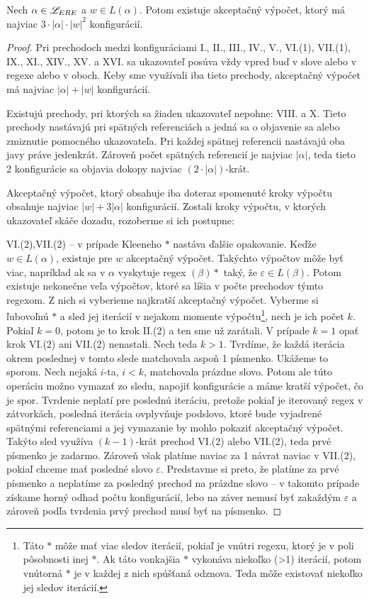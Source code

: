 \begin{lema}\label{dlzka_vypoctu_rw}
Nech $\alpha \in \mathscr{L}_{ERE}$ a $w \in L(\alpha)$. Potom existuje akceptačný výpočet, ktorý má najviac $3\cdot|\alpha|\cdot|w|^2$ konfigurácií.
\end{lema}
\begin{proof}
Pri prechodoch medzi konfiguráciami I., II., III., IV., V., VI.(1), VII.(1), IX., XI., XIV., XV. a XVI. sa ukazovateľ posúva vždy vpred buď v slove alebo v regexe alebo v oboch. Keby sme využívali iba tieto prechody, akceptačný výpočet má najviac $\left\vert{\alpha}\right\vert+|w|$ konfigurácií.

Existujú prechody, pri ktorých sa žiaden ukazovateľ nepohne: VIII. a X. Tieto prechody nastávajú pri spätných referenciách a jedná sa o objavenie sa alebo zmiznutie pomocného ukazovateľa. Pri každej spätnej referencii nastávajú oba javy práve jedenkrát. Zároveň počet spätných referencií je najviac $|\alpha|$, teda tieto 2 konfigurácie sa objavia dokopy najviac $(2\cdot\left\vert{\alpha}\right\vert)$-krát.

Akceptačný výpočet, ktorý obsahuje iba doteraz spomenuté kroky výpočtu obsahuje najviac $|w|+3|\alpha|$ konfigurácií. Zostali kroky výpočtu, v ktorých ukazovateľ skáče dozadu, rozoberme si ich postupne:

VI.(2),VII.(2) -- v prípade Kleeneho $*$ nastáva ďalšie opakovanie. Keďže $w\in L(\alpha)$, existuje pre $w$ akceptačný výpočet. Takýchto výpočtov môže byť viac, napríklad ak sa v $\alpha$ vyskytuje regex $(\beta)*$ taký, že $\varepsilon \in L(\beta)$. Potom existuje nekonečne veľa výpočtov, ktoré sa líšia v počte prechodov týmto regexom. Z nich si vyberieme najkratší akceptačný výpočet. Vyberme si ľubovoľnú $*$ a sled jej iterácií v nejakom momente výpočtu\footnote{Táto $*$ môže mať viac sledov iterácií, pokiaľ je vnútri regexu, ktorý je v poli pôsobnosti inej $*$. Ak táto vonkajšia $*$ vykonáva niekoľko (>1) iterácií, potom vnútorná $*$ je v každej z nich spúšťaná odznova. Teda môže existovať niekoľko jej sledov iterácií.}, nech je ich počet $k$. Pokiaľ $k=0$, potom je to krok II.(2) a ten sme už zarátali. V prípade $k=1$ opať krok VI.(2) ani VII.(2) nenastali. Nech teda $k>1$. Tvrdíme, že každá iterácia okrem poslednej v tomto slede matchovala aspoň 1 písmenko. Ukážeme to sporom. Nech nejaká $i$-ta, $i<k$, matchovala prázdne slovo. Potom ale túto operáciu možno vymazať zo sledu, napojiť konfigurácie a máme kratší výpočet, čo je spor. Tvrdenie neplatí pre poslednú iteráciu, pretože pokiaľ je iterovaný regex v zátvorkách, posledná iterácia ovplyvňuje podslovo, ktoré bude vyjadrené spätnými referenciami a jej vymazanie by mohlo pokaziť akceptačný výpočet. Takýto sled využíva $(k-1)$-krát prechod VI.(2) alebo VII.(2), teda prvé písmenko je zadarmo. Zároveň však platíme naviac za 1 návrat naviac v VII.(2), pokiaľ chceme mať posledné slovo $\varepsilon$. Predstavme si preto, že platíme za prvé písmenko a neplatíme za posledný prechod na prázdne slovo -- v takomto prípade získame horný odhad počtu konfigurácií, lebo na záver nemusí byť zakaždým $\varepsilon$ a zároveň podľa tvrdenia prvý prechod musí byť na písmenko.


\end{proof}
